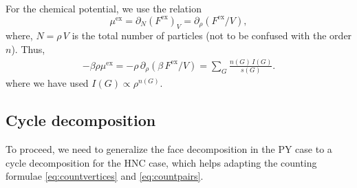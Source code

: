 \documentclass[preprint]{revtex4-1}
\newcommand{\supex}[1]{ { { #1 }^{ \mathrm{ex} } } }
\newcommand{\Fex}{\supex{F}}
\newcommand{\muex}{\supex{\mu}}
\begin{document}
For the chemical potential, we use the relation
\begin{equation}
  \muex = \partial_N(\Fex)_V = \partial_\rho(\Fex/V),
  \label{eq:muexdFex}
\end{equation}
where,
$N = \rho \, V$
is the total number of particles
(not to be confused with the order $n$).
%
Thus,
%
\begin{align}
    - \beta \rho \muex
  =
  -\rho \, \partial_\rho(\beta \, \Fex/V)
  =
    \sum_G \frac{ n(G) \, I(G) } { s(G) }.
\label{eq:hncmugsum}
\end{align}
where we have used $I(G) \propto \rho^{n(G)}$.





\subsection{Cycle decomposition}



To proceed, we need to generalize the face decomposition in the PY case
  to a cycle decomposition for the HNC case,
  which helps adapting the counting formulae
  \eqref{eq:countvertices} and \eqref{eq:countpairs}.
\end{document}
